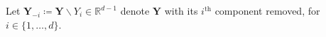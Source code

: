 \documentclass[12pt,compact]{article}
\DeclareMathOperator{\CE}{\mathrm{CE}}
\begin{document}
Let $\symbf{Y}_{-i} \coloneq \symbf{Y} \backslash Y_i \in \mathbb{R}^{d-1}$ denote $\symbf{Y}$ with its $i^{\text{th}}$ component removed, for $i \in \{1, \ldots, d\}$.
\end{document}
